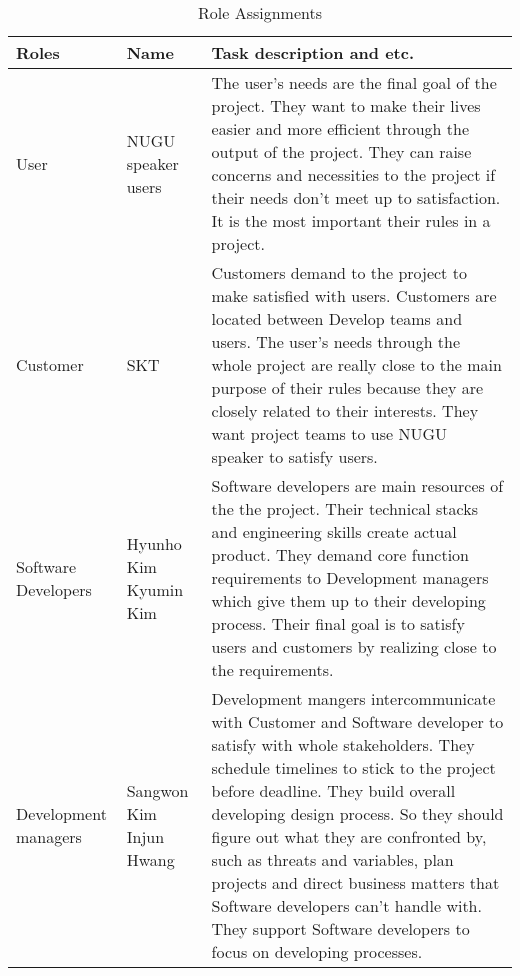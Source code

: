 \documentclass[conference]{IEEEtran}
\begin{document}
  \begin{table}[htbp]
  \renewcommand{\arraystretch}{1.7}
\caption{Role Assignments}
\begin{center}
\begin{tabular}{|p{1.5cm}|p{1.8cm}|p{4.2cm}|}
\hline
\textbf{Roles} & \textbf{{Name}}& \textbf{{Task description and etc.}} \\
\hline
User & NUGU speaker users & The user’s needs are the final goal of the project. They want to make their lives easier and more efficient through the output of the project. They can raise concerns and necessities to the project if their needs don’t meet up to satisfaction. It is the most important their rules in a project.  \\
\hline
Customer & SKT & Customers demand to the project to make satisfied with users. Customers are located between Develop teams and users. The user’s needs through the whole project are really close to the main purpose of their rules because they are closely related to their interests. They want project teams to use NUGU speaker to satisfy users.  \\
\hline
Software \linebreak Developers& Hyunho Kim \linebreak Kyumin Kim& Software developers are main resources of the the project. Their technical stacks and engineering skills create actual product. They demand core function requirements to Development managers which give them up to their developing process. Their final goal is to satisfy users and customers by realizing close to the requirements. \\
\hline
Development \linebreak managers& Sangwon Kim \linebreak Injun Hwang& Development mangers intercommunicate with Customer and Software developer to satisfy with whole stakeholders. They schedule timelines to stick to the project before deadline. They build overall developing design process. So they should figure out what they are confronted by, such as threats and variables, plan projects and direct business matters that Software developers can’t handle with. They support Software developers to focus on developing processes. \\
\hline
\end{tabular}
\label{tab1}
\end{center}
\end{table}

\vspace{5mm}
\end{document}

